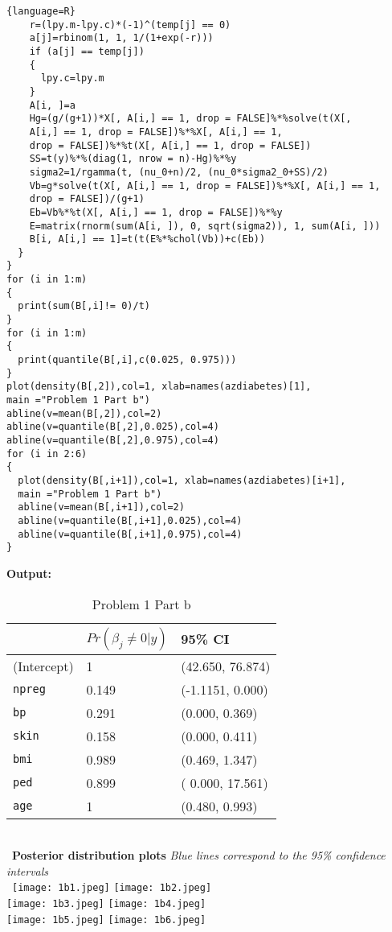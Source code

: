 \documentclass[12pt]{article}
\newenvironment{problem}[2][Problem]{\begin{trivlist}
\item[\hskip \labelsep {\bfseries #1}\hskip \labelsep {\bfseries #2.}]}{\end{trivlist}}
\begin{document}
\begin{problem}{1}
\begin{lstlisting}{language=R}
    r=(lpy.m-lpy.c)*(-1)^(temp[j] == 0)
    a[j]=rbinom(1, 1, 1/(1+exp(-r)))
    if (a[j] == temp[j]) 
    {
      lpy.c=lpy.m
    }
    A[i, ]=a
    Hg=(g/(g+1))*X[, A[i,] == 1, drop = FALSE]%*%solve(t(X[, 
    A[i,] == 1, drop = FALSE])%*%X[, A[i,] == 1, 
    drop = FALSE])%*%t(X[, A[i,] == 1, drop = FALSE])
    SS=t(y)%*%(diag(1, nrow = n)-Hg)%*%y
    sigma2=1/rgamma(t, (nu_0+n)/2, (nu_0*sigma2_0+SS)/2)
    Vb=g*solve(t(X[, A[i,] == 1, drop = FALSE])%*%X[, A[i,] == 1, 
    drop = FALSE])/(g+1)
    Eb=Vb%*%t(X[, A[i,] == 1, drop = FALSE])%*%y
    E=matrix(rnorm(sum(A[i, ]), 0, sqrt(sigma2)), 1, sum(A[i, ]))
    B[i, A[i,] == 1]=t(t(E%*%chol(Vb))+c(Eb))
  }
}
for (i in 1:m) 
{
  print(sum(B[,i]!= 0)/t)
}
for (i in 1:m) 
{
  print(quantile(B[,i],c(0.025, 0.975)))
}         
plot(density(B[,2]),col=1, xlab=names(azdiabetes)[1], 
main ="Problem 1 Part b")
abline(v=mean(B[,2]),col=2)
abline(v=quantile(B[,2],0.025),col=4)
abline(v=quantile(B[,2],0.975),col=4)
for (i in 2:6) 
{
  plot(density(B[,i+1]),col=1, xlab=names(azdiabetes)[i+1], 
  main ="Problem 1 Part b")
  abline(v=mean(B[,i+1]),col=2)
  abline(v=quantile(B[,i+1],0.025),col=4)
  abline(v=quantile(B[,i+1],0.975),col=4)
}
\end{lstlisting} 
\textbf{Output:}
\begin{table}[h]
\centering
\caption{Problem 1 Part b}
\label{my-label}
\begin{tabular}{|l|l|l|}
\hline
& $Pr(\beta_j\neq0|y)$ & 95\% CI \\ \hline
(Intercept) & 1             &  (42.650, 76.874)     \\ \hline
\texttt{npreg}       &  0.149             & (-1.1151, 0.000)   \\ \hline
\texttt{bp}          &    0.291          & (0.000, 0.369)    \\ \hline
\texttt{skin}       &  0.158            &  (0.000, 0.411)     \\ \hline
\texttt{bmi}         &   0.989           &  (0.469, 1.347)    \\ \hline
\texttt{ped}         &     0.899         &( 0.000, 17.561)  \\ \hline
\texttt{age}         &      1         & (0.480, 0.993)   \\ \hline
\end{tabular}
\end{table}
\\\
\textbf{Posterior distribution plots} \textit{Blue lines correspond to the 95\% confidence intervals}
\\\
\texttt{[image: 1b1.jpeg]}
\texttt{[image: 1b2.jpeg]}\\
\texttt{[image: 1b3.jpeg]}
\texttt{[image: 1b4.jpeg]}\\
\texttt{[image: 1b5.jpeg]}
\texttt{[image: 1b6.jpeg]}\\

\end{problem}
\end{document}

